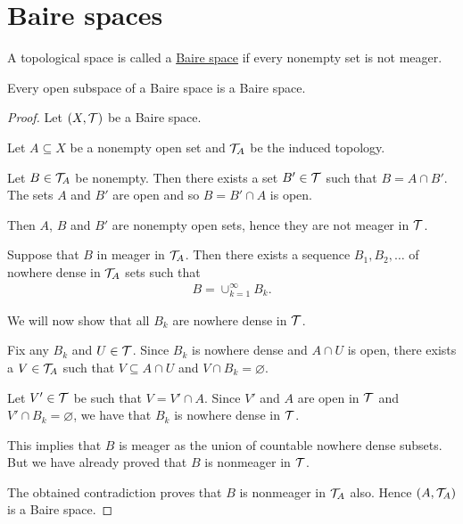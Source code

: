 \section{Baire spaces}\label{sec:baire_spaces}

\begin{definition}\label{def:baire_space}
  A topological space is called a \ul{Baire space} if every nonempty set is not meager.
\end{definition}

\begin{proposition}\label{thm:open_subspace_of_baire_space_is_baire}
  Every open subspace of a Baire space is a Baire space.
\end{proposition}
\begin{proof}
  Let $(X, \mathcal T)$ be a Baire space.

  Let $A \subseteq X$ be a nonempty open set and $\mathcal T_A$ be the induced topology.

  Let $B \in \mathcal T_A$ be nonempty. Then there exists a set $B' \in \mathcal T$ such that $B = A \cap B'$. The sets $A$ and $B'$ are open and so $B = B' \cap A$ is open.

  Then $A$, $B$ and $B'$ are nonempty open sets, hence they are not meager in $\mathcal T$.

  Suppose that $B$ in meager in $\mathcal T_A$. Then there exists a sequence $B_1, B_2, \ldots$ of nowhere dense in $\mathcal T_A$ sets such that
  \begin{align*}
    B = \cup_{k=1}^\infty B_k.
  \end{align*}

  We will now show that all $B_k$ are nowhere dense in $\mathcal T$.

  Fix any $B_k$ and $U \in \mathcal T$. Since $B_k$ is nowhere dense and $A \cap U$ is open, there exists a $V \in \mathcal T_A$ such that $V \subseteq A \cap U$ and $V \cap B_k = \varnothing$.

  Let $V' \in \mathcal T$ be such that $V = V' \cap A$. Since $V'$ and $A$ are open in $\mathcal T$ and $V' \cap B_k = \varnothing$, we have that $B_k$ is nowhere dense in $\mathcal T$.

  This implies that $B$ is meager as the union of countable nowhere dense subsets. But we have already proved that $B$ is nonmeager in $\mathcal T$.

  The obtained contradiction proves that $B$ is nonmeager in $\mathcal T_A$ also. Hence $(A, \mathcal T_A)$ is a Baire space.
\end{proof}
